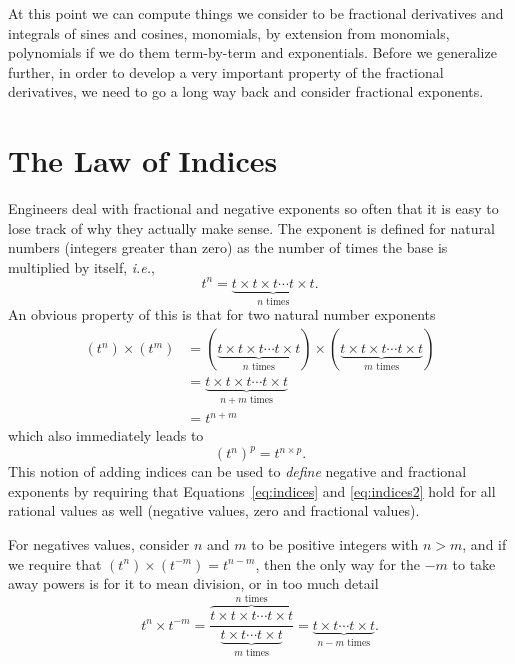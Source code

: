 At this point we can compute things we consider to be fractional derivatives and integrals of sines and cosines, monomials, by extension from monomials, polynomials if we do them term-by-term and exponentials.  Before we generalize further, in order to develop a very important property of the fractional derivatives, we need to go a long way back and consider fractional exponents.



\section{The Law of Indices}

Engineers deal with fractional and negative exponents so often that it is easy to lose track of why they actually make sense. The exponent is defined for natural numbers (integers greater than zero) as the number of times the base is multiplied by itself, \textit{i.e.},
\begin{equation}
  t^n = \underbrace{t \times t \times t \cdots t \times t}_{\mbox{$n$ times}}.
  \label{eq:power}
\end{equation}
An obvious property of this is that for two natural number exponents
\begin{align}
  \left(t^n\right) \times \left( t^m \right) &=  \left( \underbrace{t \times t \times t \cdots t \times t}_{\mbox{$n$ times}}
  \right) \times \left( \underbrace{t \times t \times t \cdots t \times t}_{\mbox{$m$ times}}
  \right) \\
  &= 
  \underbrace{t \times t \times t \cdots t \times t}_{\mbox{$n + m$ times}} \\
  &= t^{n + m}
  \label{eq:indices}
\end{align}
which also immediately leads to
\begin{equation}
  \left( t^n \right)^p = t^{n \times p}.
  \label{eq:indices2}
\end{equation}
This notion of adding indices can be used to \emph{define} negative and fractional exponents by requiring that Equations~\ref{eq:indices} and \ref{eq:indices2} hold for all rational values as well (negative values, zero and fractional values). 

For negatives values, consider $n$ and $m$ to be positive integers with $n > m$, and if we require that $\left( t^n \right) \times \left( t^{-m} \right) = t^{n-m}$, then the only way for the $-m$ to take away powers is for it to mean division, or in too much detail
\begin{equation}
  t^n \times t^{-m} = \frac{\overbrace{t \times t \times t \cdots t \times t}^{\mbox{$n$ times}}}{\underbrace{t \times t \cdots t \times t}_{\mbox{$m$ times}}} = \underbrace{t \times t  \cdots t \times t}_{\mbox{$n-m$ times}}.
  \label{eq:indices3}
\end{equation}

